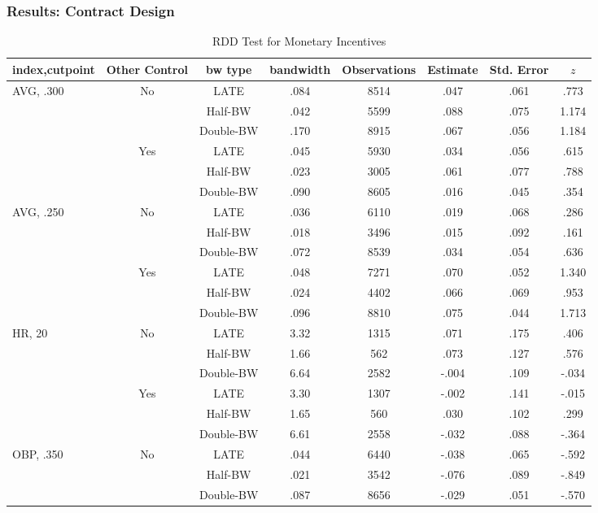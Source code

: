 \documentclass[dvipdfmx,12pt]{beamer}
\begin{document}
\begin{frame}\frametitle{Results: Contract Design}
  \begin{table}[!]
    \caption{RDD Test for Monetary Incentives}
    \label{RDD_A}
    \tiny
    \centering
    \begin{tabular}{lccccccc}\hline
      index,cutpoint & Other Control & bw type & bandwidth
      & Observations & Estimate & Std. Error & $z$
      \\ \hline \hline
      AVG, .300 & No &LATE & .084 & 8514 & .047 & .061 & .773 \\
      & &Half-BW &  .042 & 5599 & .088 & .075 & 1.174 \\
      & & Double-BW & .170 & 8915  & .067 & .056 & 1.184 \\ \cline{3-8}

      & Yes &LATE & .045 & 5930 & .034 & .056 & .615 \\
      & &Half-BW &  .023 & 3005 & .061 & .077 & .788 \\
      & & Double-BW & .090 & 8605  & .016 & .045 & .354 \\ \hline

      AVG, .250 & No &LATE & .036 & 6110 & .019 & .068 & .286 \\
      & &Half-BW &  .018 & 3496 & .015 & .092 & .161 \\
      & & Double-BW & .072 & 8539  & .034 & .054 & .636 \\ \cline{3-8}

      & Yes &LATE & .048 & 7271 & .070 & .052 & 1.340 \\
      & &Half-BW &  .024 & 4402 & .066 & .069 & .953 \\
      & & Double-BW & .096 & 8810  & .075 & .044 & 1.713 \\ \hline

      HR, 20 & No & LATE & 3.32 & 1315 & .071 & .175 & .406 \\
      & & Half-BW & 1.66 & 562 & .073 & .127 & .576 \\
      & & Double-BW & 6.64 & 2582 & -.004 & .109 & -.034 \\ \cline{3-8}

      & Yes & LATE & 3.30 & 1307 & -.002 & .141 & -.015\\
      & & Half-BW &1.65 & 560 & .030 & .102 & .299 \\
      & & Double-BW & 6.61 & 2558 & -.032 & .088 & -.364 \\ \hline

      OBP, .350 & No &LATE & .044 & 6440 & -.038 & .065 & -.592 \\
      & & Half-BW & .021 & 3542 & -.076 & .089 & -.849 \\
      & & Double-BW & .087 & 8656 & -.029 & .051 & -.570 \\ \cline{3-8}


\end{tabular}
\end{table}
\end{frame}
\end{document}

